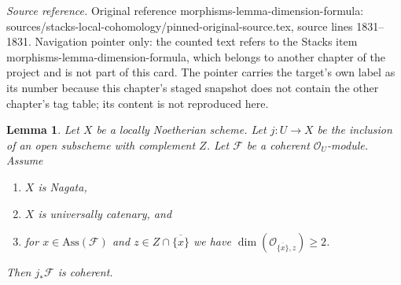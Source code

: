 \documentclass[10pt,a4paper]{amsart}
\theoremstyle{plain}
\newtheorem{lemma}[subsection]{Lemma}
\theoremstyle{definition}
\theoremstyle{remark}
\numberwithin{equation}{subsection}
\begin{document}
\noindent\textit{Source reference.} Original reference morphisms-lemma-dimension-formula: sources/stacks-local-cohomology/pinned-original-source.tex, source lines 1831--1831. Navigation pointer only: the counted text refers to the Stacks item morphisms-lemma-dimension-formula, which belongs to another chapter of the project and is not part of this card. The pointer carries the target's own label as its number because this chapter's staged snapshot does not contain the other chapter's tag table; its content is not reproduced here.\par\medskip
\begin{lemma}
\label{lemma-finiteness-pushforward}
Let $X$ be a locally Noetherian scheme.
Let $j : U \to X$ be the inclusion of an
open subscheme with complement $Z$. Let $\mathcal{F}$ be a coherent
$\mathcal{O}_U$-module. Assume
\begin{enumerate}
\item $X$ is Nagata,
\item $X$ is universally catenary, and
\item for $x \in \text{Ass}(\mathcal{F})$ and
$z \in Z \cap \overline{\{x\}}$ we have
$\dim(\mathcal{O}_{\overline{\{x\}}, z}) \geq 2$.
\end{enumerate}
Then $j_*\mathcal{F}$ is coherent.
\end{lemma}
\end{document}
